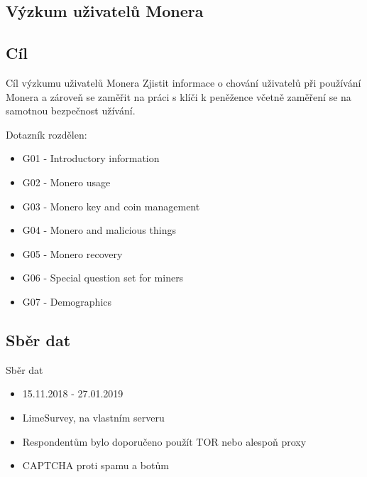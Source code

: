 \documentclass{beamer}
\begin{document}
    
   
  \begin{darkframes}
    \section{Výzkum uživatelů Monera}
    \subsection{Cíl}
    \begin{frame}{Cíl výzkumu uživatelů Monera}
Zjistit informace o chování uživatelů při používání Monera a zároveň se zaměřit na práci s klíči k peněžence včetně zaměření se na samotnou bezpečnost užívání.

Dotazník rozdělen:
\begin{itemize}
\item<1-4> G01 - Introductory information
\item<1-4> G02 - Monero usage
\item<2-4> G03 - Monero key and coin management
\item<3-4> G04 - Monero and malicious things
\item<4-4> G05 - Monero recovery
\item<4-4> G06 - Special question set for miners
\item<4-4> G07 - Demographics
	\end{itemize}
	\end{frame}
    \subsection{Sběr dat}
    \begin{frame}{Sběr dat}
     \begin{itemize}
     \item 15.11.2018 - 27.01.2019
     \item LimeSurvey, na vlastním serveru
     \item Respondentům bylo doporučeno použít TOR nebo alespoň proxy
     \item CAPTCHA proti spamu a botům
     \end{itemize}
    \end{frame}

\end{darkframes}
\end{document}
